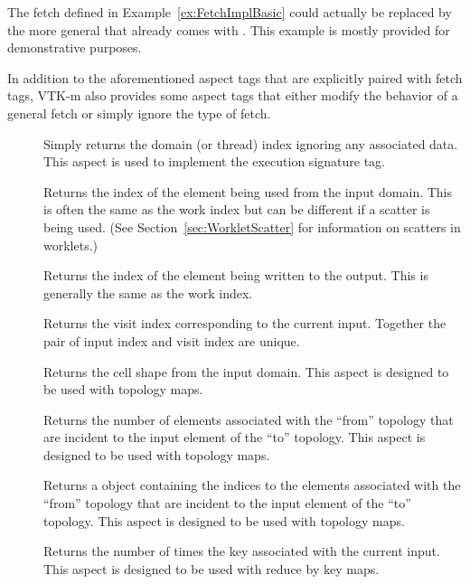 
\begin{didyouknow}
  The fetch defined in Example~\ref{ex:FetchImplBasic} could actually be replaced by the more general  that already comes with \VTKm.
  This example is mostly provided for demonstrative purposes.
\end{didyouknow}

In addition to the aforementioned aspect tags that are explicitly paired
with fetch tags, VTK-m also provides some aspect tags that either modify
the behavior of a general fetch or simply ignore the type of fetch.

\begin{description}
\item[]  Simply
  returns the domain (or thread) index ignoring any associated data. This
  aspect is used to implement the  execution signature
  tag.
\item[] 
  Returns the index of the element being used from the input domain.
  This is often the same as the work index but can be different if a scatter is being used.
  (See Section~\ref{sec:WorkletScatter} for information on scatters in worklets.)
\item[] 
  Returns the index of the element being written to the output.
  This is generally the same as the work index.
\item[] 
  Returns the visit index corresponding to the current input.
  Together the pair of input index and visit index are unique.
\item[] 
  Returns the cell shape from the input domain.
  This aspect is designed to be used with topology maps.
\item[] 
  Returns the number of elements associated with the ``from'' topology that are incident to the input element of the ``to'' topology.
  This aspect is designed to be used with topology maps.
\item[] 
  Returns a \Veclike object containing the indices to the elements associated with the ``from'' topology that are incident to the input element of the ``to'' topology.
  This aspect is designed to be used with topology maps.
\item[] 
  Returns the number of times the key associated with the current input.
  This aspect is designed to be used with reduce by key maps.
\end{description}

